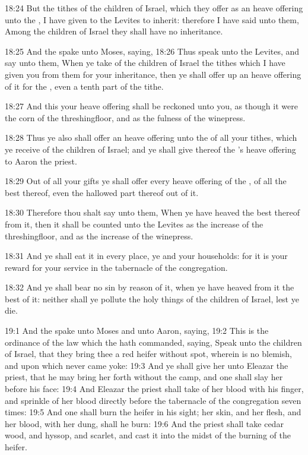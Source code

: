 18:24 But the tithes of the children of Israel, which they offer as an heave offering unto the \LORD, I have given to the Levites to inherit: therefore I have said unto them, Among the children of Israel they shall have no inheritance.

18:25 And the \LORD spake unto Moses, saying, 18:26 Thus speak unto the Levites, and say unto them, When ye take of the children of Israel the tithes which I have given you from them for your inheritance, then ye shall offer up an heave offering of it for the \LORD, even a tenth part of the tithe.

18:27 And this your heave offering shall be reckoned unto you, as though it were the corn of the threshingfloor, and as the fulness of the winepress.

18:28 Thus ye also shall offer an heave offering unto the \LORD of all your tithes, which ye receive of the children of Israel; and ye shall give thereof the \LORD's heave offering to Aaron the priest.

18:29 Out of all your gifts ye shall offer every heave offering of the \LORD, of all the best thereof, even the hallowed part thereof out of it.

18:30 Therefore thou shalt say unto them, When ye have heaved the best thereof from it, then it shall be counted unto the Levites as the increase of the threshingfloor, and as the increase of the winepress.

18:31 And ye shall eat it in every place, ye and your households: for it is your reward for your service in the tabernacle of the congregation.

18:32 And ye shall bear no sin by reason of it, when ye have heaved from it the best of it: neither shall ye pollute the holy things of the children of Israel, lest ye die.

19:1 And the \LORD spake unto Moses and unto Aaron, saying, 19:2 This is the ordinance of the law which the \LORD hath commanded, saying, Speak unto the children of Israel, that they bring thee a red heifer without spot, wherein is no blemish, and upon which never came yoke: 19:3 And ye shall give her unto Eleazar the priest, that he may bring her forth without the camp, and one shall slay her before his face: 19:4 And Eleazar the priest shall take of her blood with his finger, and sprinkle of her blood directly before the tabernacle of the congregation seven times: 19:5 And one shall burn the heifer in his sight; her skin, and her flesh, and her blood, with her dung, shall he burn: 19:6 And the priest shall take cedar wood, and hyssop, and scarlet, and cast it into the midst of the burning of the heifer.

